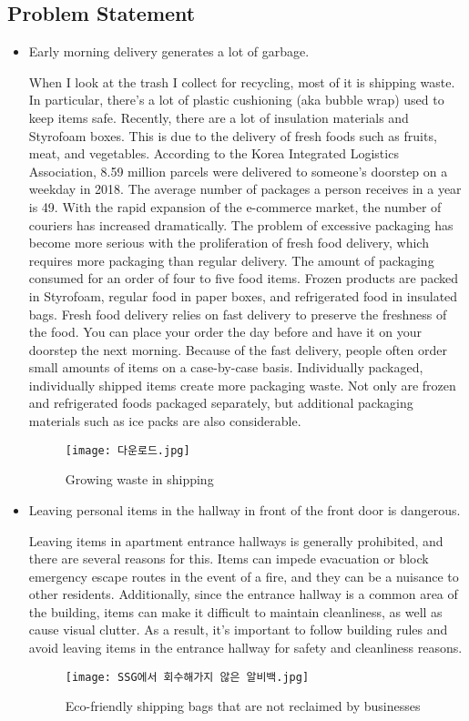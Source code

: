 \documentclass[conference]{IEEEtran}
\begin{document}
\subsection{Problem Statement}
\begin{itemize}
    \item Early morning delivery generates a lot of garbage.\par
    When I look at the trash I collect for recycling, most of it is shipping waste. In particular, there's a lot of plastic cushioning (aka bubble wrap) used to keep items safe. Recently, there are a lot of insulation materials and Styrofoam boxes. This is due to the delivery of fresh foods such as fruits, meat, and vegetables.
    According to the Korea Integrated Logistics Association, 8.59 million parcels were delivered to someone's doorstep on a weekday in 2018. The average number of packages a person receives in a year is 49. With the rapid expansion of the e-commerce market, the number of couriers has increased dramatically. The problem of excessive packaging has become more serious with the proliferation of fresh food delivery, which requires more packaging than regular delivery.
    The amount of packaging consumed for an order of four to five food items. Frozen products are packed in Styrofoam, regular food in paper boxes, and refrigerated food in insulated bags. 
    Fresh food delivery relies on fast delivery to preserve the freshness of the food. You can place your order the day before and have it on your doorstep the next morning. Because of the fast delivery, people often order small amounts of items on a case-by-case basis. Individually packaged, individually shipped items create more packaging waste. Not only are frozen and refrigerated foods packaged separately, but additional packaging materials such as ice packs are also considerable. 
        \begin{figure}[h]
            \centerline{
                \texttt{[image: 다운로드.jpg]}
            }
        \label{fig}
        \caption{ Growing waste in shipping}
        \end{figure}
    
    \item Leaving personal items in the hallway in front of the front door is dangerous. \par
    Leaving items in apartment entrance hallways is generally prohibited, and there are several reasons for this. Items can impede evacuation or block emergency escape routes in the event of a fire, and they can be a nuisance to other residents. Additionally, since the entrance hallway is a common area of the building, items can make it difficult to maintain cleanliness, as well as cause visual clutter. As a result, it's important to follow building rules and avoid leaving items in the entrance hallway for safety and cleanliness reasons.
    \begin{figure}[h]
            \centerline{
                \texttt{[image: SSG에서 회수해가지 않은 알비백.jpg]}
            }
        \label{fig}
        \caption{Eco-friendly shipping bags that are not reclaimed by businesses}
        \end{figure}
    

\end{itemize}
\end{document}
